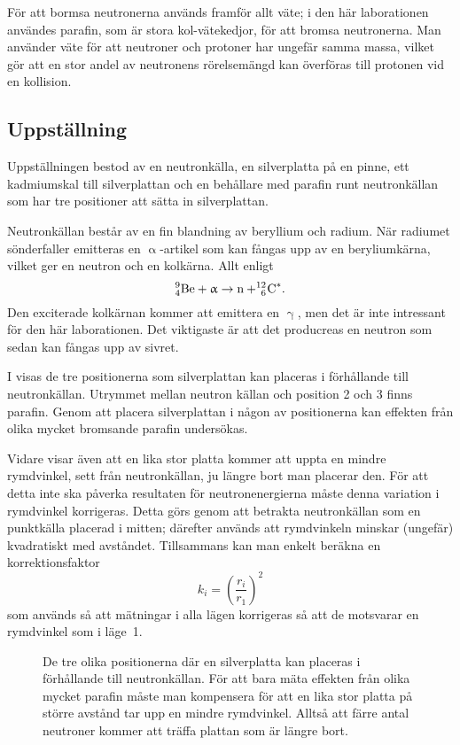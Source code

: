 \documentclass[11pt,a4paper, english, swedish
]{article}
\newcommand{\A}{\ifmmode\upalpha\else$\upalpha$\fi}
\newcommand{\G}{\ifmmode\upgamma\else$\upgamma$\fi}
\begin{document}
För att bormsa neutronerna används framför allt väte; i den här laborationen användes parafin, som är stora kol-vätekedjor, för att bromsa neutronerna. Man använder väte för att neutroner och protoner har ungefär samma massa, vilket gör att en stor andel av neutronens rörelsemängd kan överföras till protonen vid en kollision. 

\subsection{Uppställning}
Uppställningen bestod av en neutronkälla, en silverplatta på en pinne, ett kadmiumskal till silverplattan och en behållare med parafin runt neutronkällan som har tre positioner att sätta in silverplattan.

Neutronkällan består av en fin blandning av beryllium och radium. När radiumet sönderfaller emitteras en \A-artikel som kan fångas upp av en beryliumkärna, vilket ger en neutron och en kolkärna. Allt enligt
\begin{equation}
^9_4\text{Be} + \A \to \text{n} + ^{12}_{\phantom{1}6}\!\text{C}^*.
\end{equation}
Den exciterade kolkärnan kommer att emittera en \G, men det är inte intressant för den här laborationen. Det viktigaste är att det producreas en neutron som sedan kan fångas upp av sivret.

I  visas de tre positionerna som silverplattan kan placeras i förhållande till neutronkällan. Utrymmet mellan neutron källan och position 2 och 3  finns parafin. Genom att placera silverplattan i någon av positionerna kan effekten från olika mycket bromsande parafin undersökas.

Vidare visar även  att en lika stor platta kommer att uppta en mindre rymdvinkel, sett från neutronkällan, ju längre bort man placerar den. För att detta inte ska påverka resultaten för neutronenergierna måste denna variation i rymdvinkel korrigeras. Detta görs genom att betrakta neutronkällan som en punktkälla placerad i mitten; därefter används att rymdvinkeln minskar (ungefär) kvadratiskt med avståndet. Tillsammans kan man enkelt beräkna en korrektionsfaktor 
\begin{equation} \label{eq:k}
k_i=\left(\frac{r_i}{r_1} \right)^2
\end{equation}
som används så att mätningar i alla lägen korrigeras så att de motsvarar en rymdvinkel som i läge~1.

\begin{figure}\centering
\resizebox{.5\textwidth}{!}{}
\caption{De tre olika positionerna där en silverplatta kan placeras i förhållande till neutronkällan. 
För att bara mäta effekten från olika mycket parafin måste man kompensera för att en lika stor platta på större avstånd tar upp en mindre rymdvinkel. Alltså att färre antal neutroner kommer att träffa plattan som är längre bort.}
\label{fig:aktivering}
\end{figure}
\end{document}

